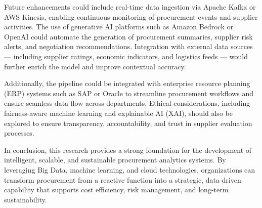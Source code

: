 \documentclass[10pt, twocolumn]{article}
\begin{document}
Future enhancements could include real-time data ingestion via Apache Kafka or AWS Kinesis, enabling continuous monitoring of procurement events and supplier activities. The use of generative AI platforms such as Amazon Bedrock or OpenAI could automate the generation of procurement summaries, supplier risk alerts, and negotiation recommendations. Integration with external data sources — including supplier ratings, economic indicators, and logistics feeds — would further enrich the model and improve contextual accuracy.

Additionally, the pipeline could be integrated with enterprise resource planning (ERP) systems such as SAP or Oracle to streamline procurement workflows and ensure seamless data flow across departments. Ethical considerations, including fairness-aware machine learning and explainable AI (XAI), should also be explored to ensure transparency, accountability, and trust in supplier evaluation processes.

In conclusion, this research provides a strong foundation for the development of intelligent, scalable, and sustainable procurement analytics systems. By leveraging Big Data, machine learning, and cloud technologies, organizations can transform procurement from a reactive function into a strategic, data-driven capability that supports cost efficiency, risk management, and long-term sustainability.

 
\end{document}
